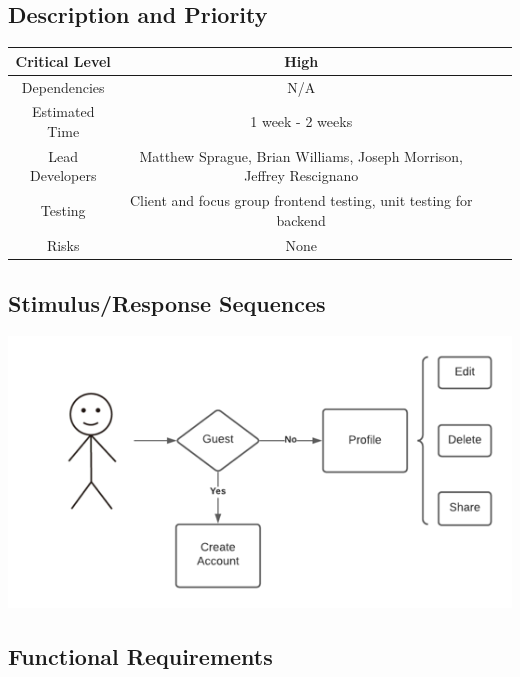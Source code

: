 \documentclass{scrreprt}
\begin{document}
\subsection{Description and Priority}
\begin{center}
    \begin{tabular}{| c | c | c | c |}
        \hline
        Critical Level & High \\
        \hline
        Dependencies & N/A \\
        \hline
        Estimated Time & 1 week - 2 weeks \\
        \hline
        Lead Developers & Matthew Sprague, Brian Williams, Joseph Morrison, Jeffrey Rescignano \\
        \hline
        Testing & Client and focus group frontend testing, unit testing for backend \\
        \hline
        Risks & None \\
        \hline
    \end{tabular}
\end{center}

\subsection{Stimulus/Response Sequences}

\includegraphics{FlowCharts/Recipe-Creation.png}

\subsection{Functional Requirements}
\end{document}

